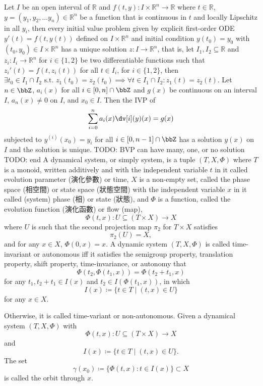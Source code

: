 \documentclass[a4paper,12pt]{report}
\begin{document}
Let $I$ be an open interval of $\mathbb{R}$ and $f(t,y)\colon I\times\mathbb{R}^n\to\mathbb{R}$ where $t\in\mathbb{R}$, $y=(y_1, y_2,\dots  y_n)\in\mathbb{R}^n$ be a function that is continuous in $t$ and locally Lipschitz in all $y_i$, then every initial value problem given by explicit first-order ODE $y'(t)=f\left(t,y(t)\right)$ defined on $I\times\mathbb{R}^n$ and initial condition $y\left(t_{0}\right)=y_{0}$ with $(t_{0},y_{0})\in I\times\mathbb{R}^n$ has a unique solution $z\colon I\to\mathbb {R}^n$, that is, let $I_1,I_2\subseteq\mathbb{R}$ and $z_i\colon I_i\to\mathbb{R}^n$ for $i\in\{1,2\}$ be two differentiable functions such that $z_i'(t)=f\left(t,z_i(t)\right)$ for all $t\in I_i$, for $i\in\{1,2\}$, then $\exists t_0\in I_1\cap I_2\text{\ s.t.\ }z_1(t_0)=z_2(t_0)\implies\forall t\in I_1\cap I_2\colon z_1(t)=z_2(t)$.
Let $n\in\bbZ$, $a_i(x)$ for all $i\in[0,n]\cap\bbZ$ and $g(x)$ be continuous on an interval $I$, $a_n(x)\ne0$ on $I$, and $x_0\in I$. Then the IVP of
\[\sum_{i=0}^na_i(x)\dv[i](y)(x)=g(x)\]
subjected to $y^{(i)}(x_0)=y_i$ for all $i\in[0,n-1]\cap\bbZ$ has a solution $y(x)$ on $I$ and the solution is unique.
TODO: BVP can have many, one, or no solution
TODO: end
A dynamical system, or simply system, is a tuple $(T, X, \Phi)$ where $T$ is a monoid, written additively and with the independent variable $t$ in it called evolution parameter (演化參數) or time, $X$ is a non-empty set, called the phase space (相空間) or state space (狀態空間) with the independent variable $x$ in it called (system) phase (相) or state (狀態), and $\Phi$ is a function, called the evolution function (演化函數) or flow (map),
\[\Phi(t,x)\colon U\subseteq(T\times X)\to X\]
where $U$ is such that the second projection map $\pi_2$ for $T\times X$ satisfies
\[\pi_2(U)=X,\]
and for any $x \in X$, $\Phi (0,x)=x$.
A dynamic system $(T, X, \Phi)$ is called time-invariant or autonomous iff it satisfies the semigroup property, translation property, shift property, time-invariance, or autonomy that
\[\Phi (t_{2},\Phi (t_{1},x))=\Phi (t_{2}+t_{1},x)\]
for any $t_{1},t_{2}+t_{1}\in I(x)$ and $t_{2}\in I(\Phi (t_{1},x))$, in which
\[I(x)\coloneq\{t\in T\mid(t,x)\in U\}\]
for any $x\in X$.

Otherwise, it is called time-variant or non-autonomous.
Given a dynamical system $(T, X, \Phi)$ with
\[\Phi(t,x)\colon U\subseteq(T\times X)\to X\]
and
\[I(x)\coloneq\{t\in T\mid(t,x)\in U\}.\]
The set
\[\gamma(x_0)\coloneq\{\Phi (t,x)\colon t\in I(x)\}\subset X\]
is called the orbit through $x$.
\end{document}
